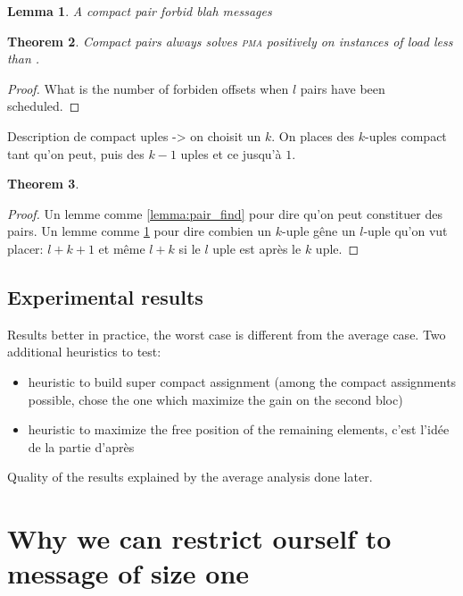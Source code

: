 \documentclass[10pt, conference, letterpaper]{IEEEtran}
\newtheorem{theorem}{Theorem}
\newtheorem{lemma}[theorem]{Lemma}
\newcommand\pma{\textsc{pma}\xspace}
\begin{document}
\begin{lemma}\label{lemma:pair_forbid}
A compact pair forbid blah messages 
\end{lemma}

\begin{theorem}
Compact pairs always solves \pma positively on instances of load less than
$ $.
\end{theorem}
\begin{proof}
What is the number of forbiden offsets when $l$ pairs have been scheduled.

\end{proof}


Description de compact uples -> on choisit un $k$. 
On places des $k$-uples compact tant qu'on peut, puis des $k-1$ uples
et ce jusqu'à $1$.

\begin{theorem}
\end{theorem}
\begin{proof}
Un lemme comme \ref{lemma:pair_find} pour dire qu'on peut constituer des pairs.
Un lemme comme \ref{lemma:pair_forbid} pour dire combien un $k$-uple gêne 
un $l$-uple qu'on vut placer: $l+k+1$ et même $l+k$ si le $l$ uple est après le $k$ uple.
\end{proof}



\subsection{Experimental results}

Results better in practice, the worst case is different from the 
average case.
Two additional heuristics to test:
\begin{itemize}
	\item  heuristic to build super compact assignment (among the compact assignments
possible, chose the one which maximize the gain on the second bloc)
	\item heuristic to maximize the free position of the remaining elements, c'est l'idée
	de la partie d'après
\end{itemize}

Quality of the results explained by the average analysis done later.
 

\section{Why we can restrict ourself to message of size one}
\end{document}
